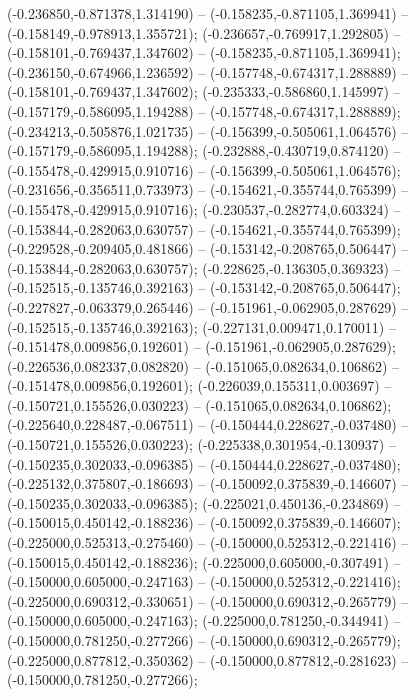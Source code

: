  (-0.236850,-0.871378,1.314190) -- (-0.158235,-0.871105,1.369941) -- (-0.158149,-0.978913,1.355721);
 (-0.236657,-0.769917,1.292805) -- (-0.158101,-0.769437,1.347602) -- (-0.158235,-0.871105,1.369941);
 (-0.236150,-0.674966,1.236592) -- (-0.157748,-0.674317,1.288889) -- (-0.158101,-0.769437,1.347602);
 (-0.235333,-0.586860,1.145997) -- (-0.157179,-0.586095,1.194288) -- (-0.157748,-0.674317,1.288889);
 (-0.234213,-0.505876,1.021735) -- (-0.156399,-0.505061,1.064576) -- (-0.157179,-0.586095,1.194288);
 (-0.232888,-0.430719,0.874120) -- (-0.155478,-0.429915,0.910716) -- (-0.156399,-0.505061,1.064576);
 (-0.231656,-0.356511,0.733973) -- (-0.154621,-0.355744,0.765399) -- (-0.155478,-0.429915,0.910716);
 (-0.230537,-0.282774,0.603324) -- (-0.153844,-0.282063,0.630757) -- (-0.154621,-0.355744,0.765399);
 (-0.229528,-0.209405,0.481866) -- (-0.153142,-0.208765,0.506447) -- (-0.153844,-0.282063,0.630757);
 (-0.228625,-0.136305,0.369323) -- (-0.152515,-0.135746,0.392163) -- (-0.153142,-0.208765,0.506447);
 (-0.227827,-0.063379,0.265446) -- (-0.151961,-0.062905,0.287629) -- (-0.152515,-0.135746,0.392163);
 (-0.227131,0.009471,0.170011) -- (-0.151478,0.009856,0.192601) -- (-0.151961,-0.062905,0.287629);
 (-0.226536,0.082337,0.082820) -- (-0.151065,0.082634,0.106862) -- (-0.151478,0.009856,0.192601);
 (-0.226039,0.155311,0.003697) -- (-0.150721,0.155526,0.030223) -- (-0.151065,0.082634,0.106862);
 (-0.225640,0.228487,-0.067511) -- (-0.150444,0.228627,-0.037480) -- (-0.150721,0.155526,0.030223);
 (-0.225338,0.301954,-0.130937) -- (-0.150235,0.302033,-0.096385) -- (-0.150444,0.228627,-0.037480);
 (-0.225132,0.375807,-0.186693) -- (-0.150092,0.375839,-0.146607) -- (-0.150235,0.302033,-0.096385);
 (-0.225021,0.450136,-0.234869) -- (-0.150015,0.450142,-0.188236) -- (-0.150092,0.375839,-0.146607);
 (-0.225000,0.525313,-0.275460) -- (-0.150000,0.525312,-0.221416) -- (-0.150015,0.450142,-0.188236);
 (-0.225000,0.605000,-0.307491) -- (-0.150000,0.605000,-0.247163) -- (-0.150000,0.525312,-0.221416);
 (-0.225000,0.690312,-0.330651) -- (-0.150000,0.690312,-0.265779) -- (-0.150000,0.605000,-0.247163);
 (-0.225000,0.781250,-0.344941) -- (-0.150000,0.781250,-0.277266) -- (-0.150000,0.690312,-0.265779);
 (-0.225000,0.877812,-0.350362) -- (-0.150000,0.877812,-0.281623) -- (-0.150000,0.781250,-0.277266);
